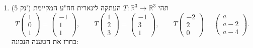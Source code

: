\documentclass[12pt, a4paper]{article}
\newcommand{\points}[1]{(#1 נק') }
\begin{document}
\begin{enumerate}
\item\points{5}
תהי $T:\mathbb{R}^3\to\mathbb{R}^3$ העתקה לינארית חח"ע המקיימת
\[
T\!\begin{pmatrix}1\\0\\1\end{pmatrix}=\begin{pmatrix}-1\\1\\1\end{pmatrix},
\qquad
T\!\begin{pmatrix}1\\2\\3\end{pmatrix}=\begin{pmatrix}-1\\3\\1\end{pmatrix},
\qquad
T\!\begin{pmatrix}-2\\2\\0\end{pmatrix}=\begin{pmatrix}a\\a-2\\ a-4 \end{pmatrix}.
\]
בחרו את הטענה הנכונה:

\begin{enumerate}
\end{enumerate}

\end{enumerate}

 \pagebreak
\end{document}
